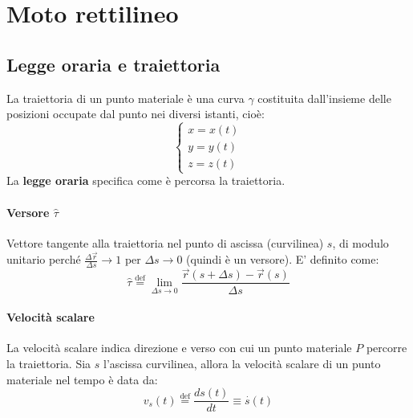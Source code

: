 \section{Moto rettilineo}

\subsection{Legge oraria e traiettoria}
La traiettoria di un punto materiale è una curva $\gamma$ costituita dall'insieme delle posizioni occupate dal punto 
nei diversi istanti, cioè: 
\begin{equation} 
\begin{cases}x=x(t)\\ y=y(t) \\ z=z(t)\end{cases}
\end{equation}
La \textbf{legge oraria} specifica come è percorsa la traiettoria.



\paragraph{Versore $\hat \tau$}
 Vettore tangente alla traiettoria nel punto di ascissa (curvilinea) $s$, di modulo unitario 
perché $\frac{\Delta \overset{\to}{r}}{\Delta s} \to 1$ per $\Delta s \to 0$ (quindi è un versore).
E' definito come: \begin{equation} 
	\hat \tau \overset{\text {def}}{=}\lim _{\Delta s\to 0}\frac{\overset{\to}{r}(s+\Delta s)-\overset{\to}{r}(s)}{\Delta s}
\end{equation}


\paragraph{Velocità scalare} 
La velocità scalare indica direzione e verso con cui un punto materiale $P$ percorre la traiettoria. 
Sia $s$ l'ascissa curvilinea, allora la velocità scalare di un punto materiale nel tempo è data da: 
\begin{equation}
	v_s(t)\overset{\text {def}}{=}\frac{ds(t)}{dt}\equiv \overset{\cdot}{s}(t)
\end{equation}


 
